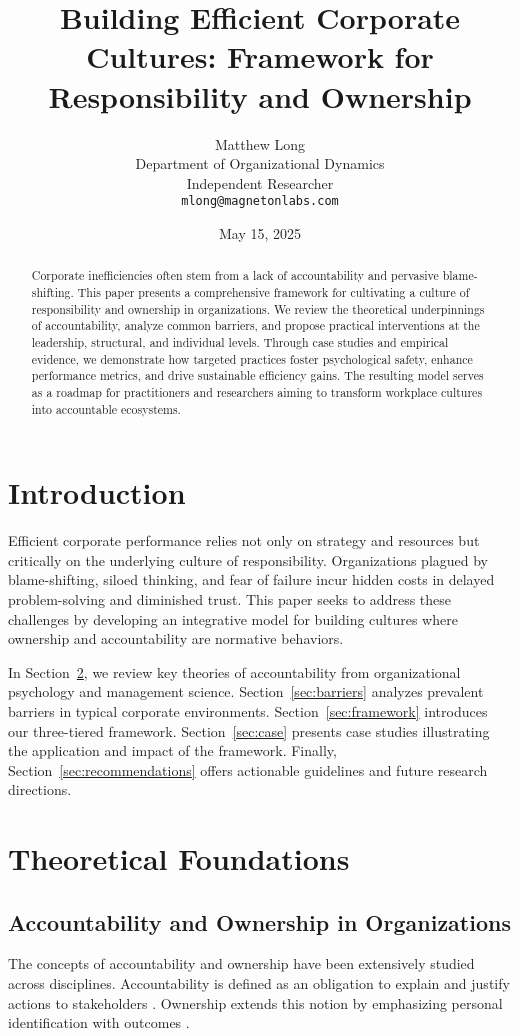 \documentclass[11pt,a4paper]{article}
\title{Building Efficient Corporate Cultures: \A Framework for Responsibility and Ownership}
\author{Matthew Long\\Department of Organizational Dynamics\\Independent Researcher\\\texttt{mlong@magnetonlabs.com}}
\date{May 15, 2025}
\begin{document}
\maketitle
\begin{abstract}
Corporate inefficiencies often stem from a lack of accountability and pervasive blame-shifting. This paper presents a comprehensive framework for cultivating a culture of responsibility and ownership in organizations. We review the theoretical underpinnings of accountability, analyze common barriers, and propose practical interventions at the leadership, structural, and individual levels. Through case studies and empirical evidence, we demonstrate how targeted practices foster psychological safety, enhance performance metrics, and drive sustainable efficiency gains. The resulting model serves as a roadmap for practitioners and researchers aiming to transform workplace cultures into accountable ecosystems.
\end{abstract}

\section{Introduction}
Efficient corporate performance relies not only on strategy and resources but critically on the underlying culture of responsibility. Organizations plagued by blame-shifting, siloed thinking, and fear of failure incur hidden costs in delayed problem-solving and diminished trust. This paper seeks to address these challenges by developing an integrative model for building cultures where ownership and accountability are normative behaviors.

In Section~\ref{sec:theory}, we review key theories of accountability from organizational psychology and management science. Section~\ref{sec:barriers} analyzes prevalent barriers in typical corporate environments. Section~\ref{sec:framework} introduces our three-tiered framework. Section~\ref{sec:case} presents case studies illustrating the application and impact of the framework. Finally, Section~\ref{sec:recommendations} offers actionable guidelines and future research directions.

\section{Theoretical Foundations}\label{sec:theory}
\subsection{Accountability and Ownership in Organizations}
The concepts of accountability and ownership have been extensively studied across disciplines. Accountability is defined as an obligation to explain and justify actions to stakeholders \cite{Day2002,Hall2008}. Ownership extends this notion by emphasizing personal identification with outcomes \cite{Pierce2001}.
\end{document}
